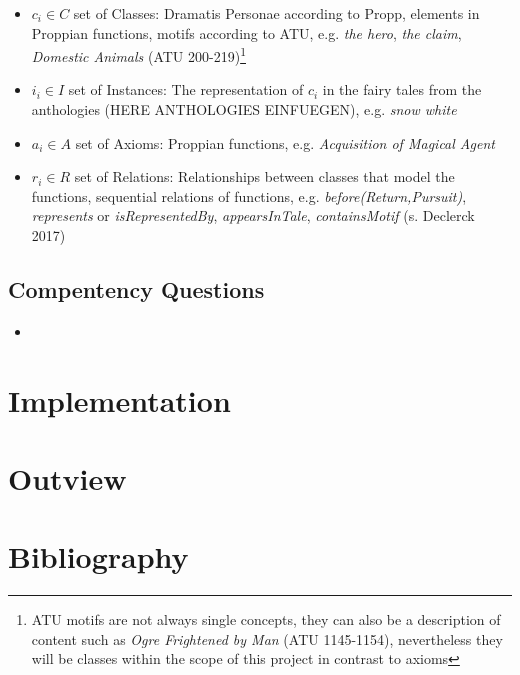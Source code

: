 \documentclass[10pt,a4paper]{article}
\begin{document}
\begin{itemize}
	
	\item $c_{i} \in C $ set of Classes: Dramatis Personae according to Propp, elements in Proppian functions, motifs according to ATU, e.g. \textit{the hero}, \textit{the claim},       \textit{Domestic Animals} (ATU 200-219)\footnote{ATU motifs are not always single concepts, they can also be a description of content such as \textit{Ogre Frightened by Man} (ATU 1145-1154), nevertheless they will be classes within the scope of this project in contrast to axioms}
	\item $i_{i} \in I $ set of Instances: The representation of $c_{i}$ in the fairy tales from the anthologies (HERE ANTHOLOGIES EINFUEGEN), e.g. \textit{snow white} 
	\item $a_{i} \in A$  set of Axioms: Proppian functions, e.g. \textit{Acquisition of Magical Agent} 
	\item $r_{i} \in R $ set of Relations: Relationships between classes that model the functions, sequential relations of functions, e.g. \textit{before(Return,Pursuit)}, \textit{represents} or \textit{isRepresentedBy}, \textit{appearsInTale}, \textit{containsMotif} (s. Declerck 2017)
	 
\end{itemize}
	 \subsection{Compentency Questions}
	 	\begin{itemize}
			\item
		\end{itemize}

\section{Implementation}
\section{Outview}
\section{Bibliography}

 

\end{document}

